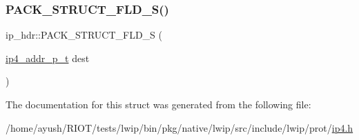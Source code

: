 \subsubsection{\texorpdfstring{P\+A\+C\+K\+\_\+\+S\+T\+R\+U\+C\+T\+\_\+\+F\+L\+D\+\_\+\+S()}{PACK\_STRUCT\_FLD\_S()}\hspace{0.1cm}{\footnotesize\ttfamily [4/4]}}
{\footnotesize\ttfamily ip\+\_\+hdr\+::\+P\+A\+C\+K\+\_\+\+S\+T\+R\+U\+C\+T\+\_\+\+F\+L\+D\+\_\+S (\begin{DoxyParamCaption}\item[{\hyperlink{native_2lwip_2src_2include_2lwip_2prot_2ip4_8h_ae5011654fcbadf6b6582b8d49446107f}{ip4\+\_\+addr\+\_\+p\+\_\+t}}]{dest }\end{DoxyParamCaption})}



The documentation for this struct was generated from the following file\+:\begin{DoxyCompactItemize}
\item 
/home/ayush/\+R\+I\+O\+T/tests/lwip/bin/pkg/native/lwip/src/include/lwip/prot/\hyperlink{native_2lwip_2src_2include_2lwip_2prot_2ip4_8h}{ip4.\+h}\end{DoxyCompactItemize}
